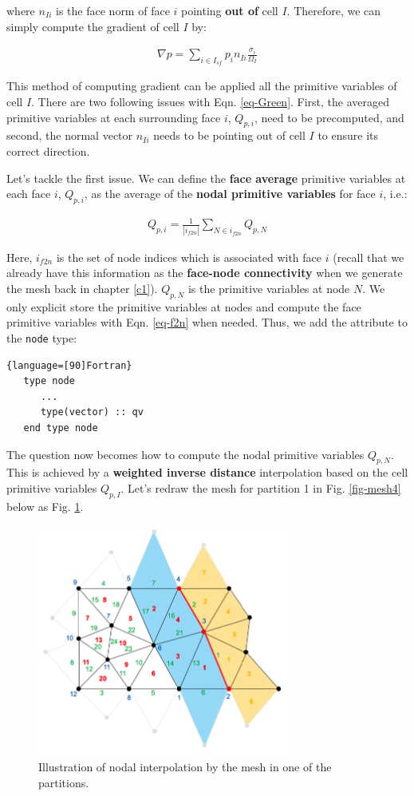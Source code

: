 \documentclass[12pt, letterpaper]{report}
\begin{document}
where $n_{Ii}$ is the face norm of face $i$ pointing {\bf out of} cell $I$. Therefore, we can simply
compute the gradient of cell $I$ by:

\begin{align}\label{eq-Green}
   \nabla p = \sum_{i \in I_{sf}} p_i n_{Ii} \frac{\sigma_i}{\Omega_I}
\end{align}

This method of computing gradient can be applied all the primitive variables of cell $I$. There are
two following issues with Eqn. \ref{eq-Green}. First, the averaged primitive variables at each
surrounding face $i$, $Q_{p,i}$, need to be precomputed, and second, the normal vector $n_{Ii}$
needs to be pointing out of cell $I$ to ensure its correct direction. \paraspace

Let's tackle the first issue. We can define the {\bf face average} primitive variables at each
face $i$, $Q_{p,i}$, as the average of the {\bf nodal primitive variables} for face $i$, i.e.:

\begin{align}\label{eq-f2n}
   Q_{p,i} = \frac{1}{|i_{f2n}|} \sum_{N \in i_{f2n}} Q_{p,N}
\end{align}

Here, $i_{f2n}$ is the set of node indices which is associated with face $i$ (recall that we already
have this information as the {\bf face-node connectivity} when we generate the mesh back in chapter
\ref{c1}). $Q_{p,N}$ is the primitive variables at node $N$. We only explicit store the primitive
variables at nodes and compute the face primitive variables with Eqn. \ref{eq-f2n} when needed.
Thus, we add the attribute to the \verb+node+ type:

\begin{lstlisting}{language=[90]Fortran}
   type node
      ...
      type(vector) :: qv
   end type node
\end{lstlisting}

The question now becomes how to compute the nodal primitive variables $Q_{p,N}$. This is achieved by
a {\bf weighted inverse distance} interpolation based on the cell primitive variables $Q_{p,I}$.
Let's redraw the mesh for partition 1 in Fig. \ref{fig-mesh4} below as Fig. \ref{fig-alg2}.

\begin{figure}[H]
   \centering
   \includegraphics[height=3in]{Algorithm2.png}
   \caption{Illustration of nodal interpolation by the mesh in one of the partitions.}
   \label{fig-alg2}
\end{figure}
\end{document}
